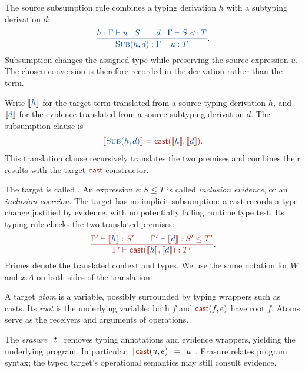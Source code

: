 \label{sec:evidence}

The source subsumption rule combines a typing derivation $h$ with a
subtyping derivation $d$:
\[
\src{\frac{h:\Gamma\vdash u:S\qquad d:\Gamma\vdash S<:T}
           {\textsc{Sub}(h,d):\Gamma\vdash u:T}}.
\]
Subsumption changes the assigned type while preserving the source
expression $u$. The chosen conversion is therefore recorded in the
derivation rather than the term.

Write $\tr{h}$ for the target term translated from a source typing
derivation $h$, and $\tr{d}$ for the evidence translated from a source
subtyping derivation $d$. The subsumption clause is
\[
\tgt{\tr{\textsc{Sub}(h,d)}=\cast{\tr{h}}{\tr{d}}.}
\]
This translation clause recursively translates the two premises and
combines their results with the target $\ev{cast}$ constructor.

The target is called \FC{}. An expression $e:S\le T$ is called
\emph{inclusion evidence}, or an \emph{inclusion coercion}.
The target has no implicit subsumption: a cast records a type change
justified by evidence, with no potentially failing runtime type test.
Its typing rule checks the two translated premises:
\[
\tgt{\frac{\Gamma'\vdash \tr{h}:S'\qquad
           \Gamma'\vdash\tr{d}:S'\le T'}
          {\Gamma'\vdash\cast{\tr{h}}{\tr{d}}:T'}}.
\]
Primes denote the translated context and types. We use the same notation
for $W$ and $x.A$ on both sides of the translation.

A target \emph{atom} is a variable, possibly surrounded by typing
wrappers such as casts. Its \emph{root} is the underlying variable:
both $f$ and $\cast{f}{e}$ have root $f$. Atoms serve as the receivers
and arguments of operations.

The \emph{erasure} $\lfloor t\rfloor$ removes typing annotations and evidence
wrappers, yielding the underlying program. In particular,
$\erase{\cast{u}{e}}=\erase{u}$.
Erasure relates program syntax; the typed target's operational semantics
may still consult evidence.

